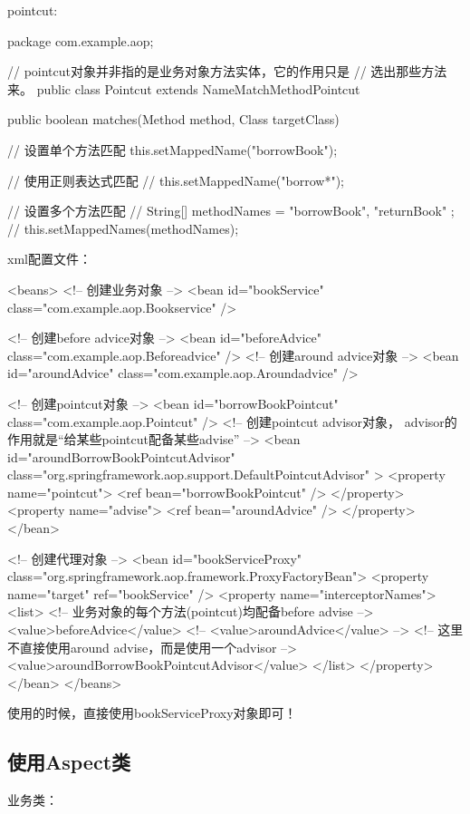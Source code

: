\documentclass[a4paper,11pt]{article}
\begin{document}
pointcut:

\begin{javacode}
package com.example.aop;

// pointcut对象并非指的是业务对象方法实体，它的作用只是
// 选出那些方法来。
public class Pointcut extends NameMatchMethodPointcut {
  public boolean matches(Method method, Class targetClass) {
    // 设置单个方法匹配
    this.setMappedName("borrowBook");

    // 使用正则表达式匹配
    // this.setMappedName("borrow*");

    // 设置多个方法匹配
    // String[] methodNames = { "borrowBook", "returnBook" };
    // this.setMappedNames(methodNames);
  }
}
\end{javacode}

xml配置文件：

\begin{xmlcode}
<beans>
  <!-- 创建业务对象 -->
  <bean id="bookService" class="com.example.aop.Bookservice" />

  <!-- 创建before advice对象 -->
  <bean id="beforeAdvice" class="com.example.aop.Beforeadvice" />
  <!-- 创建around advice对象 -->
  <bean id="aroundAdvice" class="com.example.aop.Aroundadvice" />

  <!-- 创建pointcut对象 -->
  <bean id="borrowBookPointcut" class="com.example.aop.Pointcut" />
  <!-- 创建pointcut advisor对象，
       advisor的作用就是“给某些pointcut配备某些advise” -->
  <bean id="aroundBorrowBookPointcutAdvisor"
        class="org.springframework.aop.support.DefaultPointcutAdvisor" >
    <property name="pointcut">
      <ref bean="borrowBookPointcut" />
    </property>
    <property name="advise">
      <ref bean="aroundAdvice" />
    </property>
  </bean>
    
  <!-- 创建代理对象 -->  
  <bean id="bookServiceProxy"
        class="org.springframework.aop.framework.ProxyFactoryBean">
    <property name="target" ref="bookService" />
    <property name="interceptorNames">
      <list>
        <!-- 业务对象的每个方法(pointcut)均配备before advise -->
        <value>beforeAdvice</value>
        <!-- <value>aroundAdvice</value> -->
        <!-- 这里不直接使用around advise，而是使用一个advisor -->
        <value>aroundBorrowBookPointcutAdvisor</value>
      </list>
    </property>
  </bean>
</beans>
\end{xmlcode}

使用的时候，直接使用bookServiceProxy对象即可！

\subsection[使用Aspect类]{使用Aspect类}
业务类：
\end{document}
